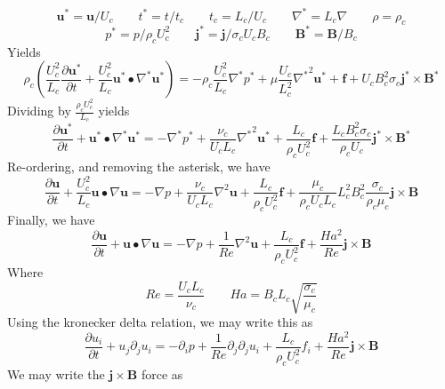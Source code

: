 \documentclass[11pt]{article}
\begin{document}
\begin{equation}
	\pmb{u}^* = \pmb{u}/U_c \qquad
	t^* = t/t_c \qquad
	t_c = L_c/U_c \qquad
	\nabla^* = L_c \nabla \qquad
	\rho = \rho_c
\end{equation}
\begin{equation}
	p^* = p/\rho_c U_c^2 \qquad
	\pmb{j}^* = \pmb{j}/ \sigma_c U_c B_c \qquad
	\pmb{B}^* = \pmb{B}/B_c
\end{equation}
Yields
\begin{equation}
	\rho_c \left( \frac{U_c^2}{L_c} \frac{\partial \pmb{u^*}}{\partial t} + \frac{U_c^2}{L_c} \pmb{u^*} \bullet \nabla^* \pmb{u^*} \right) = 
	- \rho_c \frac{U_c^2}{L_c} \nabla^*  p^* + \mu \frac{U_c}{L_c^2} {\nabla^*}^2 \pmb{u^*} + \pmb{f} +
	U_c B_c^2 \sigma_c \pmb{j^*} \times \pmb{B^*}
\end{equation}
Dividing by $\frac{\rho_c U_c^2}{L_c}$ yields
\begin{equation}
	\frac{\partial \pmb{u^*}}{\partial t} + \pmb{u^*} \bullet \nabla^* \pmb{u^*} = 
	- \nabla^*  p^* + 
	\frac{\nu_c}{U_c L_c} {\nabla^*}^2 \pmb{u^*} + \frac{L_c}{\rho_c U_c^2} \pmb{f} + 
	\frac{L_c B_c^2 \sigma_c}{\rho_c U_c} \pmb{j^*} \times \pmb{B^*}
\end{equation}
Re-ordering, and removing the asterisk, we have
\begin{equation}
	\frac{\partial \pmb{u}}{\partial t} + \frac{U_c^2}{L_c} \pmb{u} \bullet \nabla \pmb{u} = 
	- \nabla  p + 
	\frac{\nu_c}{U_c L_c} {\nabla}^2 \pmb{u} + \frac{L_c}{\rho_c U_c^2} \pmb{f} + 
	\frac{\mu_c}{\rho_c U_c L_c} 
	L_c^2 B_c^2 \frac{\sigma_c}{\rho_c \mu_c}
	\pmb{j} \times \pmb{B}
\end{equation}
Finally, we have
\begin{equation}
	\frac{\partial \pmb{u}}{\partial t} + \pmb{u} \bullet \nabla \pmb{u} = 
	-\nabla  p + 
	\frac{1}{Re} {\nabla}^2 \pmb{u} + \frac{L_c}{\rho_c U_c^2} \pmb{f} + 
	\frac{Ha^2}{Re} \pmb{j} \times \pmb{B}
\end{equation}
Where
\begin{equation}
	Re = \frac{U_c L_c}{\nu_c} \qquad
	Ha = B_c L_c \sqrt{\frac{\sigma_c}{\mu_c}} \end{equation}
	Using the kronecker delta relation, we may write this as
\begin{equation}
	\frac{\partial u_i }{\partial t} + u_j \partial_j u_i = 
	-\partial_i  p + 
	\frac{1}{Re} \partial_j \partial_j u_i + 
	\frac{L_c}{\rho_c U_c^2} f_i +
	\frac{Ha^2}{Re} \pmb{j} \times \pmb{B}
\end{equation}
We may write the $\pmb{j}\times \pmb{B}$ force as
\end{document}
